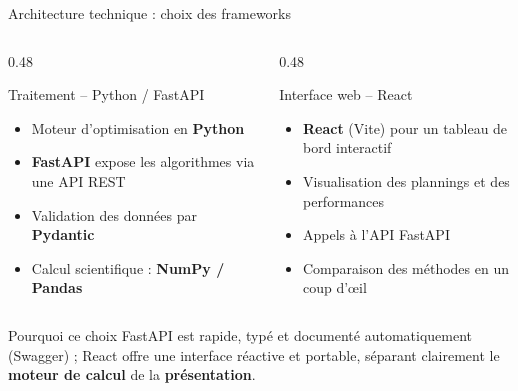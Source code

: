 \begin{frame}{Architecture technique : choix des frameworks}
  \begin{columns}[T]
    \begin{column}{0.48\textwidth}
      \begin{block}{Traitement -- Python / FastAPI}
        \small
        \begin{itemize}
          \item Moteur d'optimisation en \textbf{Python}
          \item \textbf{FastAPI} expose les algorithmes via une API REST
          \item Validation des données par \textbf{Pydantic}
          \item Calcul scientifique : \textbf{NumPy / Pandas}
        \end{itemize}
      \end{block}
    \end{column}
    \begin{column}{0.48\textwidth}
      \begin{block}{Interface web -- React}
        \small
        \begin{itemize}
          \item \textbf{React} (Vite) pour un tableau de bord interactif
          \item Visualisation des plannings et des performances
          \item Appels à l'API FastAPI
          \item Comparaison des méthodes en un coup d'œil
        \end{itemize}
      \end{block}
    \end{column}
  \end{columns}
  \vspace{0.2em}
  \begin{alertblock}{\footnotesize Pourquoi ce choix}
    \footnotesize FastAPI est rapide, typé et documenté automatiquement
    (Swagger) ; React offre une interface réactive et portable, séparant
    clairement le \textbf{moteur de calcul} de la \textbf{présentation}.
  \end{alertblock}
\end{frame}

